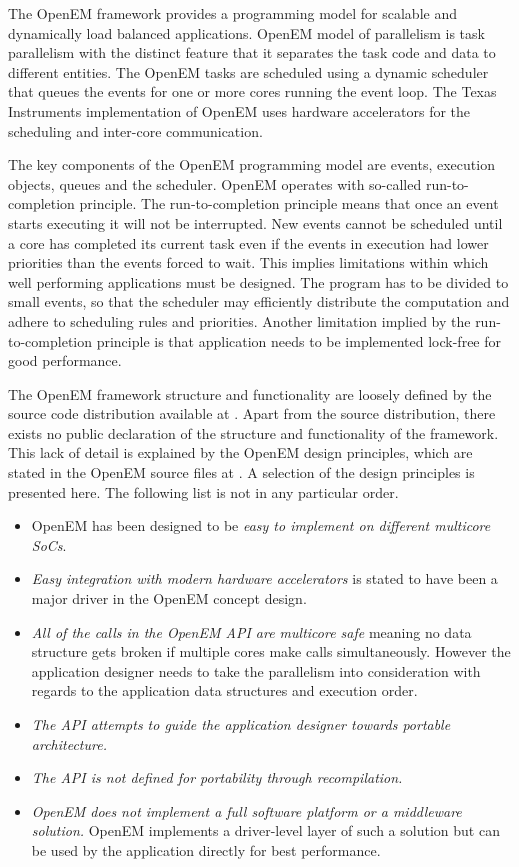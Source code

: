 The OpenEM framework provides a programming model for scalable and dynamically load balanced applications. OpenEM model of parallelism is task parallelism with the distinct feature that it separates the task code and data to different entities. The OpenEM tasks are scheduled using a dynamic scheduler that queues the events for one or more cores running the event loop. The Texas Instruments implementation of OpenEM uses hardware accelerators for the scheduling and inter-core communication.

The key components of the OpenEM programming model are events, execution objects, queues and the scheduler. OpenEM operates with so-called run-to-completion principle. The run-to-completion principle means that once an event starts executing it will not be interrupted. New events cannot be scheduled until a core has completed its current task even if the events in execution had lower priorities than the events forced to wait. This implies limitations within which well performing applications must be designed. The program has to be divided to small events, so that the scheduler may efficiently distribute the computation and adhere to scheduling rules and priorities. Another limitation implied by the run-to-completion principle is that application needs to be implemented lock-free for good performance.~\cite{openempage}

The OpenEM framework structure and functionality are loosely defined by the source code distribution available at \cite{openempage}. Apart from the source distribution, there exists no public declaration of the structure and functionality of the framework. This lack of detail is explained by the OpenEM design principles, which are stated in the OpenEM source files at \cite{openempage}. A selection of the design principles is presented here. The following list is not in any particular order.

\begin{itemize}
    \item OpenEM has been designed to be \emph{easy to implement on different multicore SoCs}.
    \item \emph{Easy integration with modern hardware accelerators} is stated to have been a major driver in the OpenEM concept design.
    \item \emph{All of the calls in the OpenEM API are multicore safe} meaning no data structure gets broken if multiple cores make calls simultaneously. However the application designer needs to take the parallelism into consideration with regards to the application data structures and execution order.
    \item \emph{The API attempts to guide the application designer towards portable architecture.}
    \item \emph{The API is not defined for portability through recompilation.}
    \item \emph{OpenEM does not implement a full software platform or a middleware solution.} OpenEM implements a driver-level layer of such a solution but can be used by the application directly for best performance.
\end{itemize}

